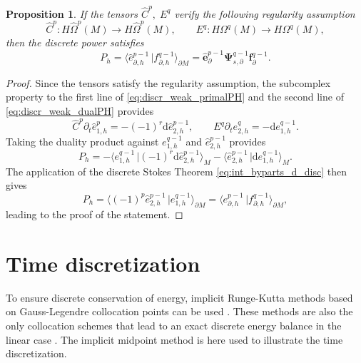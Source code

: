 \documentclass{elsarticle}
\newtheorem{proposition}{Proposition}
\renewcommand\d{\ensuremath{\mathrm{d}}}
\newcommand*{\dual}[1]{\ensuremath{\widehat{#1}}}
\newcommand{\dualpr}[3][]{\ensuremath{\langle #2 \, \vert #3 \rangle_{#1}}}
\begin{document}
\begin{proposition}\label{pr:discr_Hdot}
If the tensors $\dual{C}^p, \; E^q$ verify the following regularity assumption
\begin{equation}\label{eq:reg_C}
    \dual{C}^p: H\dual{\Omega}^p(M) \rightarrow H\dual{\Omega}^p(M), \qquad E^q: H\Omega^q(M) \rightarrow H\Omega^q(M),
\end{equation}
then the discrete power satisfies
\begin{equation}
    P_h = \dualpr[\partial M]{\dual{e}_{\partial, h}^{p-1}}{f_{\partial, h}^{q-1}} = \dual{\mathbf{e}}^{p-1}_\partial \mathbf{\Psi}^{q-1}_{s, \partial} \mathbf{f}^{q-1}_\partial.
\end{equation}
\end{proposition}

\begin{proof}
Since the tensors satisfy the regularity assumption, the subcomplex property \cite[Lemma 3.8]{arnold2006acta} to the first line of \eqref{eq:discr_weak_primalPH} and the second line of \eqref{eq:discr_weak_dualPH} provides
\begin{equation*}
\dual{C}^p\partial_t\dual{e}^p_{1, h} = -(-1)^r\d \dual{e}^{p-1}_{2, h}, \qquad E^q\partial_t{e}^q_{2, h} = -\d e^{q-1}_{1, h}.
\end{equation*}
Taking the duality product against $e^{q-1}_{1, h}$ and $\dual{e}_{2, h}^{p-1}$ provides
\begin{equation*}
P_h= -\dualpr[M]{e^{q-1}_{1, h}}{(-1)^r\d \dual{e}^{p-1}_{2, h}}-\dualpr[M]{\dual{e}_{2, h}^{p-1}}{\d e^{q-1}_{1, h}}.
\end{equation*}
The application of the discrete Stokes Theorem \eqref{eq:int_byparts_d_disc} then gives
\begin{equation*}
P_h = \dualpr[\partial M]{(-1)^p \dual{e}^{p-1}_{2, h}}{e^{q-1}_{1, h}}= \dualpr[\partial M]{e_{\partial, h}^{p-1}}{f_{\partial, h}^{q-1}},
\end{equation*}
leading to the proof of the statement.
\end{proof}


\section{Time discretization}\label{sec:time_discr}

To ensure discrete conservation of energy, implicit Runge-Kutta methods based on Gauss-Legendre collocation points can be used \cite{sanzserna1992}. These methods are also the only collocation schemes that lead to an exact discrete energy balance in the linear case \cite{kotyczka2019discrete}. The implicit midpoint method is here used to illustrate the time discretization. \\
\end{document}
